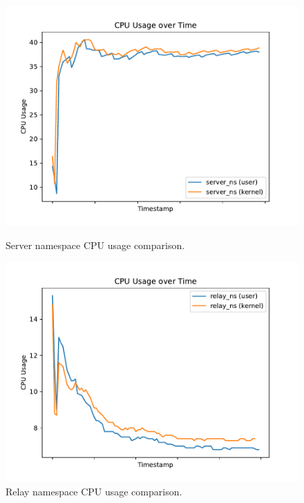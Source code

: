 \begin{figure}[H]
    \begin{minipage}{0.48\textwidth}
        \centering
        \includegraphics[width=1\linewidth]{figures/04_testing_and_results/cpu_usage_server_ns.pdf}
        \caption[Server CPU usage comparison]{Server namespace CPU usage comparison.}\label{fig:cpu-utilization-server}
    \end{minipage}\hfill
    \begin{minipage}{0.48\textwidth}
        \centering
        \includegraphics[width=1\linewidth]{figures/04_testing_and_results/cpu_usage_relay_ns.pdf}
        \caption[Relay CPU usage comparison]{Relay namespace CPU usage comparison.}\label{fig:cpu-utilization-relay}

\end{minipage}
\end{figure}

